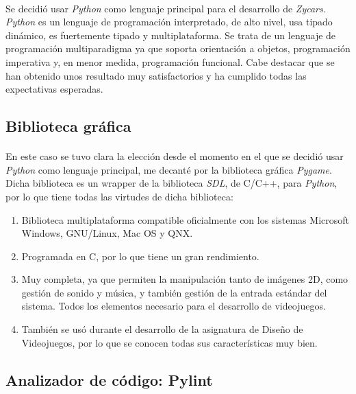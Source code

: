 \documentclass[a4paper,11pt]{article} %
\begin{document}
\paragraph{}
Se decidió usar \emph{Python} como lenguaje principal para el desarrollo de \emph{Zycars}. \emph{Python} es un lenguaje de 
programación interpretado, de alto nivel, usa tipado dinámico, es fuertemente tipado y multiplataforma. Se trata de un lenguaje de 
programación multiparadigma ya que soporta orientación a objetos, programación imperativa y, en menor medida, programación 
funcional. Cabe destacar que se han obtenido unos resultado muy satisfactorios y ha cumplido todas las expectativas esperadas.

\subsection{Biblioteca gráfica}

\paragraph{}
En este caso se tuvo clara la elección desde el momento en el que se decidió usar \emph{Python} como lenguaje principal, me decanté
por la biblioteca gráfica \emph{Pygame}. Dicha biblioteca es un wrapper de la biblioteca \emph{SDL}, de C/C++, para \emph{Python}, 
por lo que tiene todas las virtudes de dicha biblioteca:

\begin{enumerate}
    \item Biblioteca multiplataforma compatible oficialmente con los sistemas Microsoft Windows, GNU/Linux, Mac OS y QNX.
    
    \item Programada en C, por lo que tiene un gran rendimiento.
    
    \item Muy completa, ya que permiten la manipulación tanto de imágenes 2D, como gestión de sonido y música, y también gestión
    de la entrada estándar del sistema. Todos los elementos necesario para el desarrollo de videojuegos.
    
    \item También se usó durante el desarrollo de la asignatura de Diseño de Videojuegos, por lo que se conocen todas sus 
    características muy bien.
\end{enumerate}

\subsection{Analizador de código: Pylint}
\end{document}
